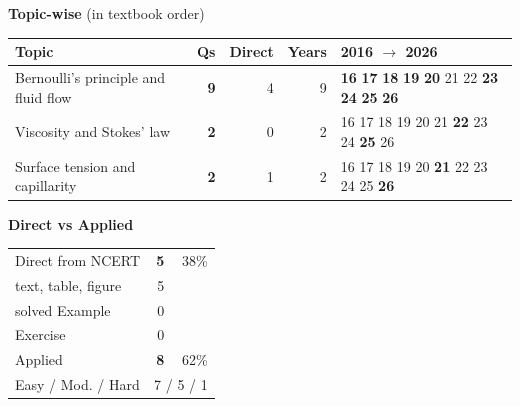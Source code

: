 {\small\textbf{\color{crimson}Topic-wise} (in textbook order)\par\smallskip
\begin{tabularx}{\linewidth}{@{}>{\raggedright\arraybackslash}Xrrrl@{}}\toprule
Topic & Qs & Direct & Years & 2016 $\rightarrow$ 2026\\\midrule
Bernoulli's principle and fluid flow & \textbf{9} & 4 & 9 & {\scriptsize \textbf{16} \textbf{17} \textbf{18} \textbf{19} \textbf{20} {\color{gray!45}21} {\color{gray!45}22} \textbf{23} \textbf{24} \textbf{25} \textbf{26}}\\
Viscosity and Stokes' law & \textbf{2} & 0 & 2 & {\scriptsize {\color{gray!45}16} {\color{gray!45}17} {\color{gray!45}18} {\color{gray!45}19} {\color{gray!45}20} {\color{gray!45}21} \textbf{22} {\color{gray!45}23} {\color{gray!45}24} \textbf{25} {\color{gray!45}26}}\\
Surface tension and capillarity & \textbf{2} & 1 & 2 & {\scriptsize {\color{gray!45}16} {\color{gray!45}17} {\color{gray!45}18} {\color{gray!45}19} {\color{gray!45}20} \textbf{21} {\color{gray!45}22} {\color{gray!45}23} {\color{gray!45}24} {\color{gray!45}25} \textbf{26}}\\
\bottomrule\end{tabularx}}\par\medskip
\begin{minipage}[t]{0.34\linewidth}{\small\textbf{\color{crimson}Direct vs Applied}\par\smallskip
\begin{tabular}{@{}lrr@{}}\toprule
Direct from NCERT & \textbf{5} & 38\%\\
\quad text, table, figure & 5 &\\
\quad solved Example & 0 &\\
\quad Exercise & 0 &\\
Applied & \textbf{8} & 62\%\\\midrule
Easy / Mod. / Hard & \multicolumn{2}{r}{7 / 5 / 1}\\\bottomrule
\end{tabular}}\end{minipage}\hfill
